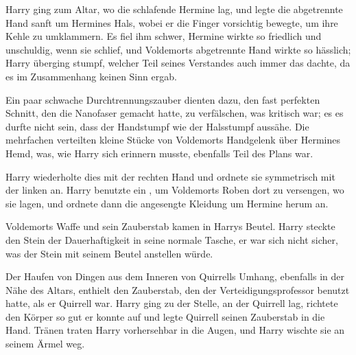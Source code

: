 Harry ging zum Altar, wo die schlafende Hermine lag, und legte die abgetrennte Hand sanft um Hermines Hals, wobei er die Finger vorsichtig bewegte, um ihre Kehle zu umklammern.
Es fiel ihm schwer, Hermine wirkte so friedlich und unschuldig, wenn sie schlief, und Voldemorts abgetrennte Hand wirkte so hässlich; Harry überging stumpf, welcher Teil seines Verstandes auch immer das dachte, da es im Zusammenhang keinen Sinn ergab.

Ein paar schwache Durchtrennungszauber dienten dazu, den fast perfekten Schnitt, den die Nanofaser gemacht hatte, zu verfälschen, was kritisch war; es es durfte nicht sein, dass der Handstumpf wie der Halsstumpf aussähe. Die mehrfachen  verteilten kleine Stücke von Voldemorts Handgelenk über Hermines Hemd, was, wie Harry sich erinnern musste, ebenfalls Teil des Plans war.

Harry wiederholte dies mit der rechten Hand und ordnete sie symmetrisch mit der linken an.
Harry benutzte ein , um Voldemorts Roben dort zu versengen, wo sie lagen, und ordnete dann die angesengte Kleidung um Hermine herum an.

Voldemorts Waffe und sein Zauberstab kamen in Harrys Beutel. Harry steckte den Stein der Dauerhaftigkeit in seine normale Tasche, er war sich nicht sicher, was der Stein mit seinem Beutel anstellen würde.

Der Haufen von Dingen aus dem Inneren von Quirrells Umhang, ebenfalls in der Nähe des Altars, enthielt den Zauberstab, den der Verteidigungsprofessor benutzt hatte, als er Quirrell war. Harry ging zu der Stelle, an der Quirrell lag, richtete den Körper so gut er konnte auf und legte Quirrell seinen Zauberstab in die Hand. Tränen traten Harry vorhersehbar in die Augen, und Harry wischte sie an seinem Ärmel weg.

